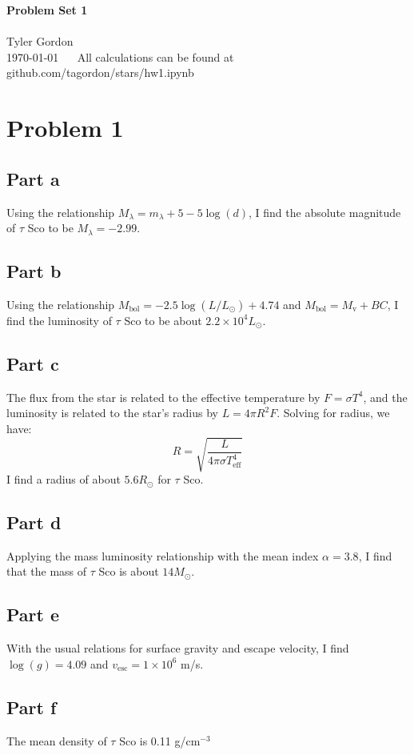 \documentclass[a4paper, 11pt]{article}
\newcommand{\mytitle}{Problem Set 1}
\begin{document}
\noindent
\large\textbf{\mytitle} \\ \\ Tyler Gordon \\
\normalsize \today 
\ \ \hrulefill
All calculations can be found at github.com/tagordon/stars/hw1.ipynb
\section*{Problem 1}
	\subsection*{Part a}
		Using the relationship $M_\lambda = m_\lambda + 5 - 5\log(d)$, I find the absolute magnitude of 
		$\tau$ Sco to be $M_\lambda = -2.99$.
	\subsection*{Part b}
		Using the relationship $M_\text{bol} = -2.5\log(L/L_\odot) + 4.74$ and $M_\text{bol} = M_\text{v} + BC$, 
		I find the luminosity of $\tau$ Sco to be about $2.2\times10^4 L_\odot$.
	\subsection*{Part c}
		The flux from the star is related to the effective temperature by $F = \sigma T^4$, and the luminosity 
		is related to the star's radius by $L = 4\pi R^2F$. Solving for radius, we have:
		\begin{equation*}
			R = \sqrt{\frac{L}{4\pi\sigma T_\text{eff}^4}}
		\end{equation*}
		I find a radius of about $5.6 R_\odot$ for $\tau$ Sco. 
	\subsection*{Part d}
		Applying the mass luminosity relationship with the mean index $\alpha = 3.8$, I find that the mass of 
		$\tau$ Sco is about $14 M_\odot$.
	\subsection*{Part e}
		With the usual relations for surface gravity and escape velocity, I find $\log(g)=4.09$ and 
		$v_\text{esc}=1\times10^6 $ m/s. 
	\subsection*{Part f}
		The mean density of $\tau$ Sco is 0.11 g/cm$^{-3}$
\end{document}
